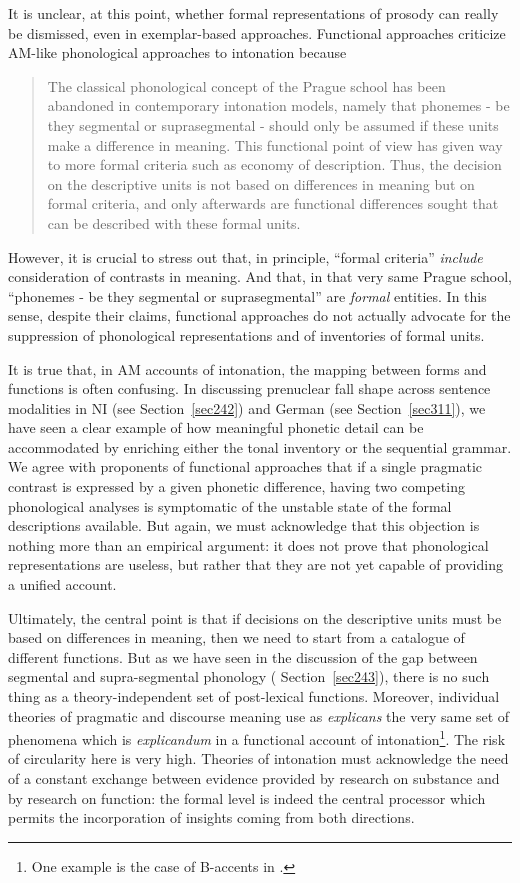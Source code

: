 It is unclear, at this point, whether formal representations of prosody can really be dismissed, even in exemplar-based approaches. Functional approaches criticize AM-like phonological approaches to intonation because \begin{quote}The classical phonological concept of the Prague school has been abandoned in contemporary intonation models, namely that phonemes - be they segmental or suprasegmental - should only be assumed if these units make a difference in meaning. This functional point of view has given way to more formal criteria such as economy of description. Thus, the decision on the descriptive units is not based on differences in meaning but on formal criteria, and only afterwards are functional differences sought that can be described with these formal units. \cite[§1.1]{batliner2005prosodic}\end{quote}
However, it is crucial to stress out that, in principle, ``formal criteria'' \textit{include} consideration of contrasts in meaning. And that, in that very same Prague school, ``phonemes - be they segmental or suprasegmental'' are \textit{formal} entities. In this sense, despite their claims, functional approaches do not actually advocate for the suppression of phonological representations and of inventories of formal units. 

It is true that, in AM accounts of intonation, the mapping between forms and functions is often confusing. In discussing prenuclear fall shape across sentence modalities in NI (see Section~\ref{sec242}) and German (see Section~\ref{sec311}), we have seen a clear example of how meaningful phonetic detail can be accommodated by enriching either the tonal inventory or the sequential grammar. We agree with proponents of functional approaches that if a single pragmatic contrast is expressed by a given phonetic difference, having two competing phonological analyses is symptomatic of the unstable state of the formal descriptions available. But again, we must acknowledge that this objection is nothing more than an empirical argument: it does not prove that phonological representations are useless, but rather that they are not yet capable of providing a unified account. 

Ultimately, the central point is that if decisions on the descriptive units must be based on differences in meaning, then we need to start from a catalogue of different functions. But as we have seen in the discussion of the gap between segmental and supra-segmental phonology ( Section~\ref{sec243}), there is no such thing as a theory-independent set of post-lexical functions. Moreover, individual theories of pragmatic and discourse meaning use as \textit{explicans} the very same set of phenomena which is \textit{explicandum} in a functional account of intonation\footnote{One example is the case of B-accents in \citet{jackendoff1972semantic}.}. The risk of circularity here is very high. Theories of intonation must acknowledge the need of a constant exchange between evidence provided by research on substance and by research on function: the formal level is indeed the central processor which permits the incorporation of insights coming from both directions.

